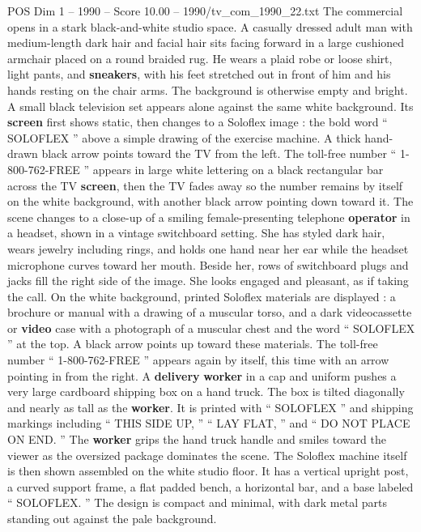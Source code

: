 \begin{textsample}{POS Dim 1 – 1990 – Score 10.00 – 1990/tv\_com\_1990\_22.txt}  \label{ex:f1_pos_044}
The commercial opens in a stark black-and-white studio space.
A casually dressed adult man with medium-length dark hair and facial hair sits facing forward in a large cushioned armchair placed on a round braided rug.
He wears a plaid robe or loose shirt, light pants, and \textbf{sneakers}, with his feet stretched out in front of him and his hands resting on the chair arms.
The background is otherwise empty and bright.
A small black television set appears alone against the same white background.
Its \textbf{screen} first shows static, then changes to a Soloflex image : the bold word “ SOLOFLEX ” above a simple drawing of the exercise machine.
A thick hand-drawn black arrow points toward the TV from the left.
The toll-free number “ 1-800-762-FREE ” appears in large white lettering on a black rectangular bar across the TV \textbf{screen}, then the TV fades away so the number remains by itself on the white background, with another black arrow pointing down toward it.
The scene changes to a close-up of a smiling female-presenting telephone \textbf{operator} in a headset, shown in a vintage switchboard setting.
She has styled dark hair, wears jewelry including rings, and holds one hand near her ear while the headset microphone curves toward her mouth.
Beside her, rows of switchboard plugs and jacks fill the right side of the image.
She looks engaged and pleasant, as if taking the call.
On the white background, printed Soloflex materials are displayed : a brochure or manual with a drawing of a muscular torso, and a dark videocassette or \textbf{video} case with a photograph of a muscular chest and the word “ SOLOFLEX ” at the top.
A black arrow points up toward these materials.
The toll-free number “ 1-800-762-FREE ” appears again by itself, this time with an arrow pointing in from the right.
A \textbf{delivery} \textbf{worker} in a cap and uniform pushes a very large cardboard shipping box on a hand truck.
The box is tilted diagonally and nearly as tall as the \textbf{worker}.
It is printed with “ SOLOFLEX ” and shipping markings including “ THIS SIDE UP, ” “ LAY FLAT, ” and “ DO NOT PLACE ON END. ” The \textbf{worker} grips the hand truck handle and smiles toward the viewer as the oversized package dominates the scene.
The Soloflex machine itself is then shown assembled on the white studio floor.
It has a vertical upright post, a curved support frame, a flat padded bench, a horizontal bar, and a base labeled “ SOLOFLEX. ” The design is compact and minimal, with dark metal parts standing out against the pale background.

\end{textsample}
